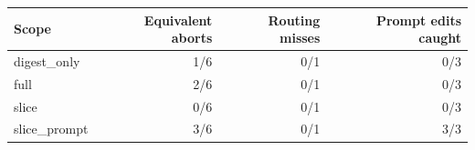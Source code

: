 \begin{tabular}{lrrr}
\toprule
Scope & Equivalent aborts & Routing misses & Prompt edits caught \\
\midrule
digest\_only & 1/6 & 0/1 & 0/3 \\
full & 2/6 & 0/1 & 0/3 \\
slice & 0/6 & 0/1 & 0/3 \\
slice\_prompt & 3/6 & 0/1 & 3/3 \\
\bottomrule
\end{tabular}
